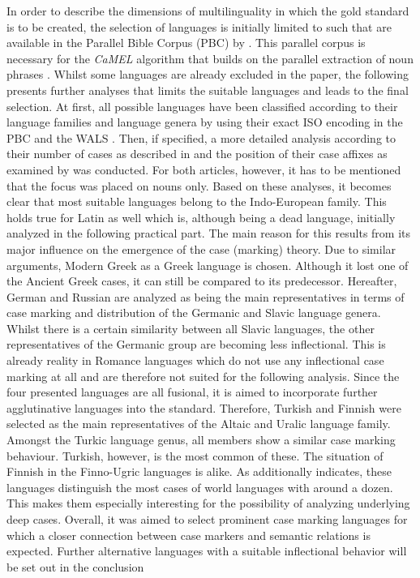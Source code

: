 \documentclass[11pt,a4paper,twoside,openright]{scrbook}
\begin{document}
In order to describe the dimensions of multilinguality in which the gold standard is to be created, the selection of languages is initially limited to such that are available in the Parallel Bible Corpus (PBC) by \citet{mayer-cysouw-2014-creating}. This parallel corpus is necessary for the \textit{CaMEL} algorithm that builds on the parallel extraction of noun phrases \citep{weissweiler2022camel}. Whilst some languages are already excluded in the paper, the following presents further analyses that limits the suitable languages and leads to the final selection. 
At first, all possible languages have been classified according to their language families and language genera by using their exact ISO encoding in the PBC and the WALS \citep{wals}. Then, if specified, a more detailed analysis according to their number of cases as described in \citet{iggesenwals49} and the position of their case affixes as examined by \citet{dryerwals51} was conducted. For both articles, however, it has to be mentioned that the focus was placed on nouns only. Based on these analyses, it becomes clear that most suitable languages belong to the Indo-European family. This holds true for Latin as well which is, although being a dead language, initially analyzed in the following practical part. The main reason for this results from its major influence on the emergence of the case (marking) theory. Due to similar arguments, Modern Greek as a Greek language is chosen. Although it lost one of the Ancient Greek cases, it can still be compared to its predecessor. Hereafter, German and Russian are analyzed as being the main representatives in terms of case marking and distribution of the Germanic and Slavic language genera. Whilst there is a certain similarity between all Slavic languages, the other representatives of the Germanic group are becoming less inflectional. This is already reality in Romance languages which do not use any inflectional case marking at all and are therefore not suited for the following analysis. Since the four presented languages are all fusional, it is aimed to incorporate further agglutinative languages into the standard. Therefore, Turkish and Finnish were selected as the main representatives of the Altaic and Uralic language family. Amongst the Turkic language genus, all members show a similar case marking behaviour. Turkish, however, is the most common of these. The situation of Finnish in the Finno-Ugric languages is alike. As \citet{blake1994case} additionally indicates, these languages distinguish the most cases of world languages with around a dozen. This makes them especially interesting for the possibility of analyzing underlying deep cases. Overall, it was aimed to select prominent case marking languages for which a closer connection between case markers and semantic relations is expected. Further alternative languages with a suitable inflectional behavior will be set out in the conclusion
\end{document}
